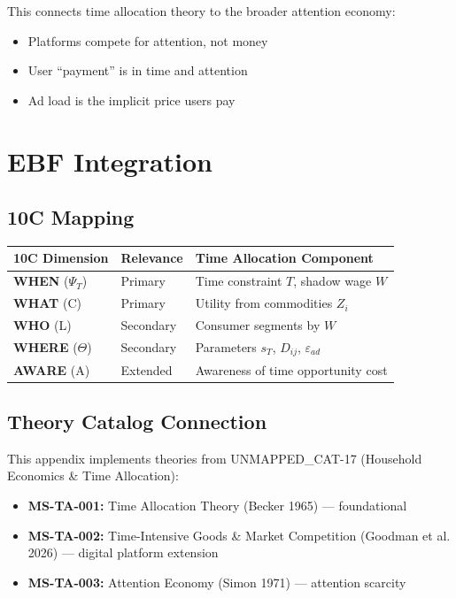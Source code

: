 This connects time allocation theory to the broader attention economy:
\begin{itemize}
\item Platforms compete for attention, not money
\item User ``payment'' is in time and attention
\item Ad load is the implicit price users pay
\end{itemize}

\section{EBF Integration}
\label{sec:pt-ebf-integration}

\subsection{10C Mapping}

\begin{center}
\begin{tabular}{lll}
\toprule
10C Dimension & Relevance & Time Allocation Component \\
\midrule
\textbf{WHEN} ($\Psi_T$) & Primary & Time constraint $T$, shadow wage $W$ \\
\textbf{WHAT} (C) & Primary & Utility from commodities $Z_i$ \\
\textbf{WHO} (L) & Secondary & Consumer segments by $W$ \\
\textbf{WHERE} ($\Theta$) & Secondary & Parameters $s_T$, $D_{ij}$, $\varepsilon_{ad}$ \\
\textbf{AWARE} (A) & Extended & Awareness of time opportunity cost \\
\bottomrule
\end{tabular}
\end{center}

\subsection{Theory Catalog Connection}

This appendix implements theories from UNMAPPED_CAT-17 (Household Economics \& Time Allocation):

\begin{itemize}
\item \textbf{MS-TA-001:} Time Allocation Theory (Becker 1965) --- foundational
\item \textbf{MS-TA-002:} Time-Intensive Goods \& Market Competition (Goodman et al. 2026) --- digital platform extension
\item \textbf{MS-TA-003:} Attention Economy (Simon 1971) --- attention scarcity
\end{itemize}

